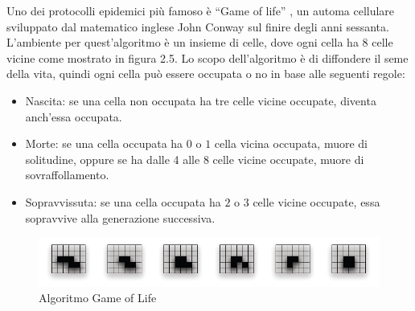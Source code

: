 Uno dei protocolli epidemici più famoso è “Game of life” \cite{gardner1970-gameoflife}, un automa cellulare sviluppato dal matematico inglese John Conway sul finire degli anni sessanta. L'ambiente per quest'algoritmo è un insieme di celle, dove ogni cella ha 8 celle vicine come mostrato in figura 2.5. Lo scopo dell'algoritmo è di diffondere il seme della vita, quindi ogni cella può essere occupata o no in base alle seguenti regole:
\begin{itemize}
	\item Nascita: se una cella non occupata ha tre celle vicine occupate, diventa anch'essa occupata.
	\item Morte: se una cella occupata ha $0$ o $1$ cella vicina occupata, muore di solitudine, oppure se ha dalle 4 alle 8 celle vicine occupate, muore di sovraffollamento.
	\item Sopravvissuta: se una cella occupata ha $2$ o $3$ celle vicine occupate, essa sopravvive alla generazione successiva.
\end{itemize}

\begin{figure}[bh]
\centering
\includegraphics[width=1\linewidth,keepaspectratio]{Images/algoritmi_gossip/game_of_life}
\caption[Game of Life]{Algoritmo Game of Life}
\label{fig:game_of_life}
\end{figure}

